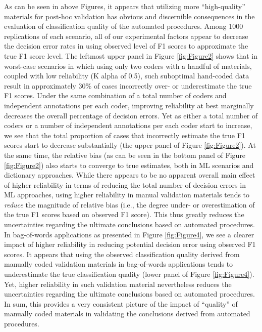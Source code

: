 \documentclass[man, 12pt, a4paper, nolmodern, noextraspace]{apa6}
\begin{document}
    As can be seen in above Figures, it appears that utilizing more \enquote{high-quality} materials for post-hoc validation has obvious and discernible consequences in the evaluation of classification quality of the automated procedures. Among 1000 replications of each scenario, all of our experimental factors appear to decrease the decision error rates in using observed level of F1 scores to approximate the true F1 score level. The leftmost upper panel in Figure \ref{fig:Figure2} shows that in worst-case scenarios in which using only two coders with a handful of materials, coupled with low reliability (K alpha of 0.5), such suboptimal hand-coded data result in approximately 30\% of cases incorrectly over- or underestimate the true F1 scores. Under the same combination of a total number of coders and independent annotations per each coder, improving reliability at best marginally decreases the overall percentage of decision errors. Yet as either a total number of coders or a number of independent annotations per each coder start to increase, we see that the total proportion of cases that incorrectly estimate the true F1 scores start to decrease substantially (the upper panel of Figure \ref{fig:Figure2}). At the same time, the relative bias (as can be seen in the bottom panel of Figure \ref{fig:Figure2}) also starts to converge to true estimates, both in ML scenarios and dictionary approaches. While there appears to be no apparent overall main effect of higher reliability in terms of reducing the total number of decision errors in ML approaches, using higher reliability in manual validation materials tends to \textit{reduce} the magnitude of relative bias (i.e., the degree under- or overestimation of the true F1 scores based on observed F1 score). This thus greatly reduces the uncertainties regarding the ultimate conclusions based on automated procedures. In bag-of-words applications as presented in Figure \ref{fig:Figure4}, we see a clearer impact of higher reliability in reducing potential decision error using observed F1 scores. It appears that using the observed classification quality derived from manually coded validation materials in bag-of-words applications tends to underestimate the true classification quality (lower panel of Figure \ref{fig:Figure4}). Yet, higher reliability in such validation material nevertheless reduces the uncertainties regarding the ultimate conclusions based on automated procedures. In sum, this provides a very consistent picture of the impact of \enquote{quality} of manually coded materials in validating the conclusions derived from automated procedures.   
\end{document}
